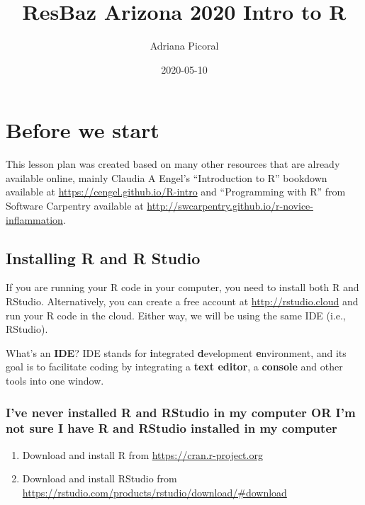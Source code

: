 \documentclass[]{book}
\title{ResBaz Arizona 2020 Intro to R}
\author{Adriana Picoral}
\date{2020-05-10}
\providecommand{\tightlist}{%
  \setlength{\itemsep}{0pt}\setlength{\parskip}{0pt}}
\begin{document}
\maketitle

{
\setcounter{tocdepth}{1}
\tableofcontents
}
\hypertarget{before-we-start}{%
\chapter{Before we start}\label{before-we-start}}

This lesson plan was created based on many other resources that are already available online, mainly Claudia A Engel's ``Introduction to R'' bookdown available at \url{https://cengel.github.io/R-intro} and ``Programming with R'' from Software Carpentry available at \url{http://swcarpentry.github.io/r-novice-inflammation}.

\hypertarget{installing-r-and-r-studio}{%
\section{Installing R and R Studio}\label{installing-r-and-r-studio}}

If you are running your R code in your computer, you need to install both R and RStudio. Alternatively, you can create a free account at \url{http://rstudio.cloud} and run your R code in the cloud. Either way, we will be using the same IDE (i.e., RStudio).

\leavevmode\hypertarget{explanation}{}%
What's an \textbf{IDE}? IDE stands for \textbf{i}ntegrated \textbf{d}evelopment \textbf{e}nvironment, and its goal is to facilitate coding by integrating a \textbf{text editor}, a \textbf{console} and other tools into one window.

\hypertarget{ive-never-installed-r-and-rstudio-in-my-computer-or-im-not-sure-i-have-r-and-rstudio-installed-in-my-computer}{%
\subsection{I've never installed R and RStudio in my computer OR I'm not sure I have R and RStudio installed in my computer}\label{ive-never-installed-r-and-rstudio-in-my-computer-or-im-not-sure-i-have-r-and-rstudio-installed-in-my-computer}}

\begin{enumerate}
\def\labelenumi{\arabic{enumi}.}
\tightlist
\item
  Download and install R from \url{https://cran.r-project.org}
\item
  Download and install RStudio from \url{https://rstudio.com/products/rstudio/download/\#download}
\end{enumerate}
\end{document}
